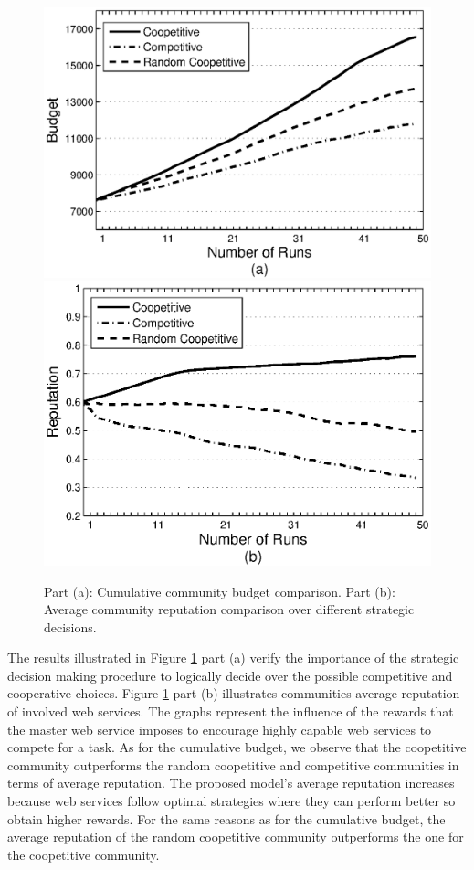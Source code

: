 \documentclass[fleqn]{singlecol-new}
\begin{document}
\begin{figure}%
\centering
\includegraphics[scale=0.41]{graphbgtmed.eps}
\includegraphics[scale=0.41]{graphrep.eps}
\caption{Part (a): Cumulative community budget comparison. Part
(b): Average community reputation comparison over different
strategic decisions.} \label{Graph1}
\end{figure}




The results illustrated in Figure \ref{Graph1} part (a)  verify
the importance of the strategic decision making procedure to
logically decide over the possible competitive and cooperative
choices. Figure \ref{Graph1} part (b) illustrates communities
average reputation of involved web services. The graphs represent
the influence of the rewards that the master web service imposes
to encourage highly capable web services to compete for a task. As
for the cumulative budget, we observe that the coopetitive
community outperforms the random coopetitive and competitive
communities in terms of average reputation. The proposed model's
average reputation increases because web services follow optimal
strategies where they can perform better so obtain higher rewards.
For the same reasons as for the cumulative budget, the average
reputation of the random coopetitive community
outperforms the one for the coopetitive community. %
\end{document}
